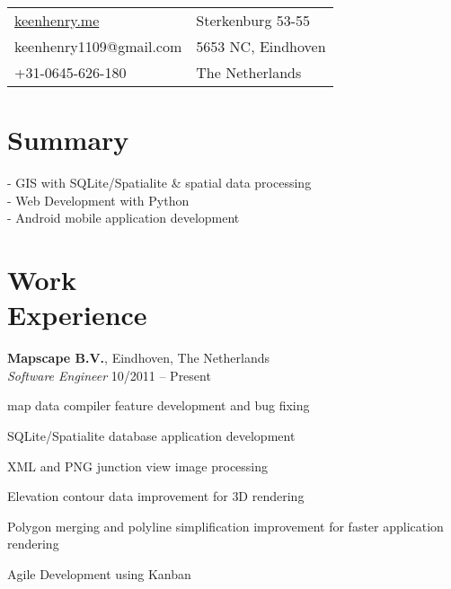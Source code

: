 \documentclass[margin,line]{resume}
\begin{document}
\begin{resume}

      \begin{tabular}{@{}p{6cm}p{8.5cm}}
      \url{keenhenry.me}      & Sterkenburg 53-55 \\
      keenhenry1109@gmail.com & 5653 NC, Eindhoven \\
      +31-0645-626-180        & The Netherlands \\
      \end{tabular}

 
    \section{\mysidestyle Summary}
      - GIS with SQLite/Spatialite \& spatial data processing \\
      - Web Development with Python \\
      - Android mobile application development \\
      
    \section{\mysidestyle Work \\ Experience}

    \textbf{Mapscape B.V.}, Eindhoven, The Netherlands \\
    \textsl{Software Engineer} \hfill 10/2011 -- Present \vspace{-3mm}\\\vspace{-1mm}%
      \begin{list2}
      \item map data compiler feature development and bug fixing
      \item SQLite/Spatialite database application development
      \item XML and PNG junction view image processing
      \item Elevation contour data improvement for 3D rendering
      \item Polygon merging and polyline simplification improvement for faster application rendering
      \item Agile Development using Kanban
      \end{list2}


\end{resume}
\end{document}
